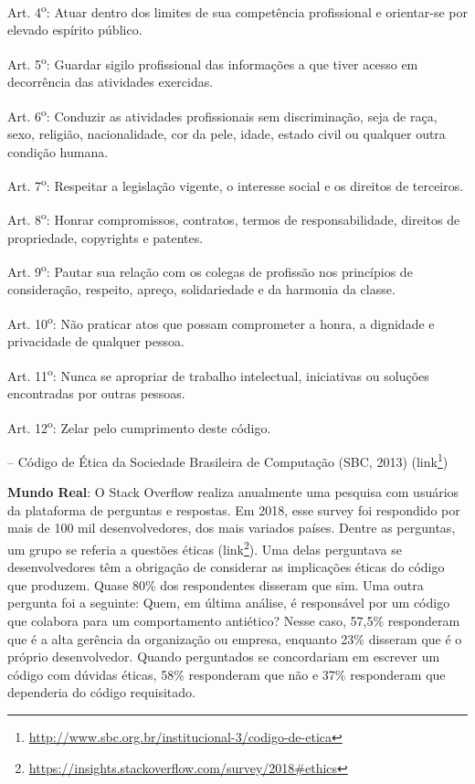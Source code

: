\documentclass[
  11pt,
  twoside]{book}
\DeclareRobustCommand{\href}[2]{#2\footnote{\url{#1}}}
\renewenvironment{quote}{\centering \vspace{1.5ex} \begin{tcolorbox}[colback=backcolor, width=4.9in]}{\end{tcolorbox}}
\newenvironment{esmbox}{\centering \vspace{1.5ex} \begin{tcolorbox}[breakable, colback=backcolor, width=4.9in]}{\end{tcolorbox} \vspace{1.5ex}}
\begin{document}
\begin{quote}
Art. 4\textsuperscript{o}: Atuar dentro dos limites de sua competência
profissional e orientar-se por elevado espírito público.

Art. 5\textsuperscript{o}: Guardar sigilo profissional das informações a
que tiver acesso em decorrência das atividades exercidas.

Art. 6\textsuperscript{o}: Conduzir as atividades profissionais sem
discriminação, seja de raça, sexo, religião, nacionalidade, cor da pele,
idade, estado civil ou qualquer outra condição humana.

Art. 7\textsuperscript{o}: Respeitar a legislação vigente, o interesse
social e os direitos de terceiros.

Art. 8\textsuperscript{o}: Honrar compromissos, contratos, termos de
responsabilidade, direitos de propriedade, copyrights e patentes.

Art. 9\textsuperscript{o}: Pautar sua relação com os colegas de
profissão nos princípios de consideração, respeito, apreço,
solidariedade e da harmonia da classe.

Art. 10\textsuperscript{o}: Não praticar atos que possam comprometer a
honra, a dignidade e privacidade de qualquer pessoa.

Art. 11\textsuperscript{o}: Nunca se apropriar de trabalho intelectual,
iniciativas ou soluções encontradas por outras pessoas.

Art. 12\textsuperscript{o}: Zelar pelo cumprimento deste código.

-- Código de Ética da Sociedade Brasileira de Computação (SBC, 2013)
(\href{http://www.sbc.org.br/institucional-3/codigo-de-etica}{link})
\end{quote}

\begin{esmbox}

\textbf{Mundo Real}: O Stack Overflow realiza anualmente uma pesquisa
com usuários da plataforma de perguntas e respostas. Em 2018, esse
survey foi respondido por mais de 100 mil desenvolvedores, dos mais
variados países. Dentre as perguntas, um grupo se referia a questões
éticas
(\href{https://insights.stackoverflow.com/survey/2018\#ethics}{link}).
Uma delas perguntava se desenvolvedores têm a obrigação de considerar as
implicações éticas do código que produzem. Quase 80\% dos respondentes
disseram que sim. Uma outra pergunta foi a seguinte: Quem, em última
análise, é responsável por um código que colabora para um comportamento
antiético? Nesse caso, 57,5\% responderam que é a alta gerência da
organização ou empresa, enquanto 23\% disseram que é o próprio
desenvolvedor. Quando perguntados se concordariam em escrever um código
com dúvidas éticas, 58\% responderam que não e 37\% responderam que
dependeria do código requisitado.

\end{esmbox}
\end{document}

